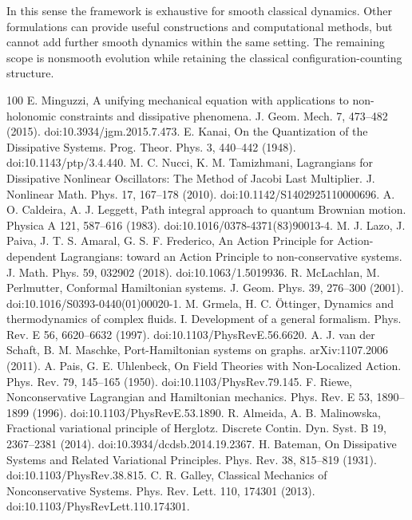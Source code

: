 \documentclass[12pt]{article}
\begin{document}
In this sense the framework is exhaustive for smooth classical dynamics. Other formulations can provide useful constructions and computational methods, but cannot add further smooth dynamics within the same setting. The remaining scope is nonsmooth evolution while retaining the classical configuration-counting structure.

\begin{thebibliography}{100}
 E. Minguzzi, A unifying mechanical equation with applications to non-holonomic constraints and dissipative phenomena. J. Geom. Mech. 7, 473--482 (2015). doi:10.3934/jgm.2015.7.473.
 E. Kanai, On the Quantization of the Dissipative Systems. Prog. Theor. Phys. 3, 440--442 (1948). doi:10.1143/ptp/3.4.440.
 M. C. Nucci, K. M. Tamizhmani, Lagrangians for Dissipative Nonlinear Oscillators: The Method of Jacobi Last Multiplier. J. Nonlinear Math. Phys. 17, 167--178 (2010). doi:10.1142/S1402925110000696.
 A. O. Caldeira, A. J. Leggett, Path integral approach to quantum Brownian motion. Physica A 121, 587--616 (1983). doi:10.1016/0378-4371(83)90013-4.
 M. J. Lazo, J. Paiva, J. T. S. Amaral, G. S. F. Frederico, An Action Principle for Action-dependent Lagrangians: toward an Action Principle to non-conservative systems. J. Math. Phys. 59, 032902 (2018). doi:10.1063/1.5019936.
 R. McLachlan, M. Perlmutter, Conformal Hamiltonian systems. J. Geom. Phys. 39, 276--300 (2001). doi:10.1016/S0393-0440(01)00020-1.
 M. Grmela, H. C. \"Ottinger, Dynamics and thermodynamics of complex fluids. I. Development of a general formalism. Phys. Rev. E 56, 6620--6632 (1997). doi:10.1103/PhysRevE.56.6620.
 A. J. van der Schaft, B. M. Maschke, Port-Hamiltonian systems on graphs. arXiv:1107.2006 (2011).
 A. Pais, G. E. Uhlenbeck, On Field Theories with Non-Localized Action. Phys. Rev. 79, 145--165 (1950). doi:10.1103/PhysRev.79.145.
 F. Riewe, Nonconservative Lagrangian and Hamiltonian mechanics. Phys. Rev. E 53, 1890--1899 (1996). doi:10.1103/PhysRevE.53.1890.
 R. Almeida, A. B. Malinowska, Fractional variational principle of Herglotz. Discrete Contin. Dyn. Syst. B 19, 2367--2381 (2014). doi:10.3934/dcdsb.2014.19.2367.
 H. Bateman, On Dissipative Systems and Related Variational Principles. Phys. Rev. 38, 815--819 (1931). doi:10.1103/PhysRev.38.815.
 C. R. Galley, Classical Mechanics of Nonconservative Systems. Phys. Rev. Lett. 110, 174301 (2013). doi:10.1103/PhysRevLett.110.174301.

\end{thebibliography}
\end{document}
